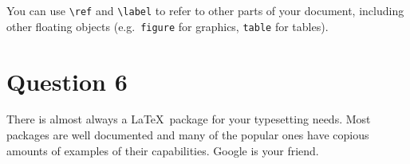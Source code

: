 \documentclass{article} %
\begin{document}
You can use \verb|\ref| and \verb|\label| to refer to other parts of your document, including other floating objects (e.g.\ \texttt{figure} for graphics, \texttt{table} for tables). 


\section*{Question 6}
There is almost always a \LaTeX\ package for your typesetting needs.  Most packages are well documented and many of the popular ones have copious amounts of examples of their capabilities.  Google is your friend.
\end{document}
